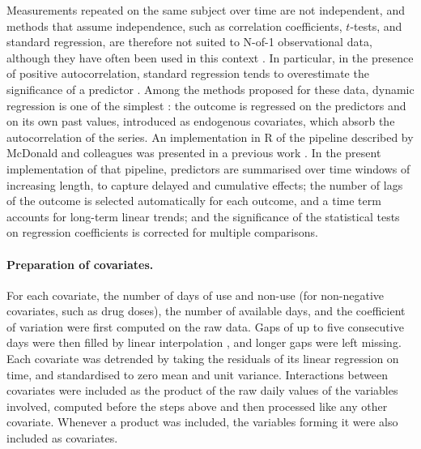 \documentclass[11pt,a4paper]{article}
\begin{document}
Measurements repeated on the same subject over time are not independent, and
methods that assume independence, such as correlation coefficients, $t$-tests, and
standard regression, are therefore not suited to N-of-1 observational data, although
they have often been used in this context \citep{mcdonald2017}. In particular, in the
presence of positive autocorrelation, standard regression tends to overestimate the
significance of a predictor \citep{montgomery2012}. Among the methods proposed for
these data, dynamic regression is one of the simplest
\citep{vieira2017,mcdonald2020}: the outcome is regressed on the predictors and on
its own past values, introduced as endogenous covariates, which absorb the
autocorrelation of the series. An implementation in R of the pipeline described by
McDonald and colleagues \citep{mcdonald2020} was presented in a previous work
\citep{maccallini2024dynreg}. In the present implementation of that pipeline, predictors are
summarised over time windows of increasing length, to capture delayed and cumulative
effects; the number of lags of the outcome is selected automatically for each
outcome, and a time term accounts for long-term linear trends; and the significance of the
statistical tests on regression coefficients is corrected for multiple comparisons.

\paragraph{Preparation of covariates.}
For each covariate, the number of days of use and non-use (for non-negative
covariates, such as drug doses), the number of available days, and the coefficient of
variation were first computed on the raw data. Gaps of up to five consecutive days
were then filled by linear interpolation \citep{zoo}, and longer gaps were left
missing. Each covariate was detrended by taking the residuals of its linear regression
on time, and standardised to zero mean and unit variance. Interactions between
covariates were included as the product of the raw daily values of the variables
involved, computed before the steps above and then processed like any other
covariate. Whenever a product was included, the variables forming it were also
included as covariates.
\end{document}

